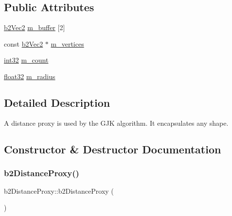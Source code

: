 \subsection*{Public Attributes}
\begin{DoxyCompactItemize}
\item 
\mbox{\hyperlink{structb2_vec2}{b2\+Vec2}} \mbox{\hyperlink{structb2_distance_proxy_a3fc5ebfa3d34ac66390b88f9277fb330}{m\+\_\+buffer}} \mbox{[}2\mbox{]}
\item 
const \mbox{\hyperlink{structb2_vec2}{b2\+Vec2}} $\ast$ \mbox{\hyperlink{structb2_distance_proxy_abaf1495b8214b74d944b57170a762f32}{m\+\_\+vertices}}
\item 
\mbox{\hyperlink{b2_settings_8h_a43d43196463bde49cb067f5c20ab8481}{int32}} \mbox{\hyperlink{structb2_distance_proxy_ae36efab1361bb1f94e32f9b956c6f1b3}{m\+\_\+count}}
\item 
\mbox{\hyperlink{b2_settings_8h_aacdc525d6f7bddb3ae95d5c311bd06a1}{float32}} \mbox{\hyperlink{structb2_distance_proxy_a459c93f35b1e62d583bd73d8c478ce89}{m\+\_\+radius}}
\end{DoxyCompactItemize}


\subsection{Detailed Description}
A distance proxy is used by the G\+JK algorithm. It encapsulates any shape. 

\subsection{Constructor \& Destructor Documentation}
\mbox{\label{structb2_distance_proxy_ae3b74189ecd4d85b078a9386274dd9b6}} 
\subsubsection{\texorpdfstring{b2DistanceProxy()}{b2DistanceProxy()}}
{\footnotesize\ttfamily b2\+Distance\+Proxy\+::b2\+Distance\+Proxy (\begin{DoxyParamCaption}{ }\end{DoxyParamCaption})\hspace{0.3cm}{\ttfamily [inline]}}



